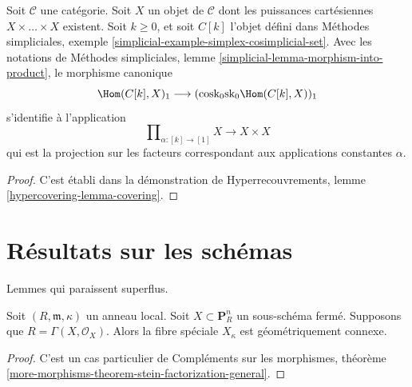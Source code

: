 \begin{lemma}
\label{lemma-cosk0-hom-deltak}
Soit $\mathcal{C}$ une catégorie. Soit $X$ un objet de $\mathcal{C}$
dont les puissances cartésiennes $X \times \ldots \times X$ existent.
Soit $k \geq 0$, et soit $C[k]$ l'objet défini dans
Méthodes simpliciales, exemple \ref{simplicial-example-simplex-cosimplicial-set}.
Avec les notations de
Méthodes simpliciales, lemme \ref{simplicial-lemma-morphism-into-product},
le morphisme canonique
$$
\Hom(C[k], X)_1
\longrightarrow
(\text{cosk}_0 \text{sk}_0 \Hom(C[k], X))_1
$$
s'identifie à l'application
$$
\prod\nolimits_{\alpha : [k] \to [1]} X
\longrightarrow
X \times X
$$
qui est la projection sur les facteurs correspondant aux applications
constantes $\alpha$.
\end{lemma}

\begin{proof}
C'est établi dans la démonstration de
Hyperrecouvrements, lemme \ref{hypercovering-lemma-covering}.
\end{proof}



\section{Résultats sur les schémas}
\label{section-devissage}

\noindent
Lemmes qui paraissent superflus.

\begin{lemma}
\label{lemma-stein-projective}
Soit $(R, \mathfrak m, \kappa)$ un anneau local.
Soit $X \subset \mathbf{P}^n_R$ un sous-schéma fermé.
Supposons que $R = \Gamma(X, \mathcal{O}_X)$. Alors la fibre spéciale
$X_\kappa$ est géométriquement connexe.
\end{lemma}

\begin{proof}
C'est un cas particulier de
Compléments sur les morphismes, théorème
\ref{more-morphisms-theorem-stein-factorization-general}.
\end{proof}

